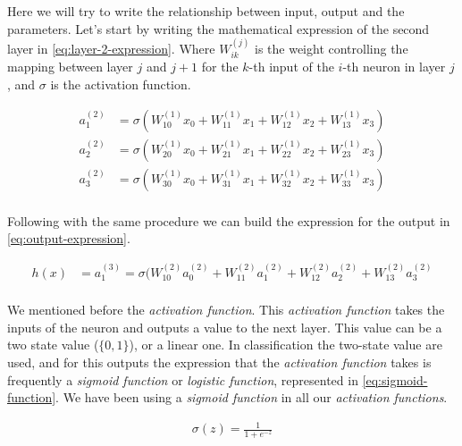 Here we will try to write the relationship between input, output and
the parameters. Let's start by writing the mathematical expression of
the second layer in \autoref{eq:layer-2-expression}. Where
$W_{ik}^{(j)}$ is the weight controlling the mapping between layer $j$
and $j + 1$ for the $k$-th input of the $i$-th neuron in layer $j$,
and $\sigma$ is the activation function.

\begin{equation}
  \begin{aligned}
    \label{eq:layer-2-expression}
    a_1^{(2)} & = \sigma(W_{10}^{(1)} x_0 + W_{11}^{(1)} x_1
    + W_{12}^{(1)} x_2 + W_{13}^{(1)} x_3) \\
    a_2^{(2)} & = \sigma(W_{20}^{(1)} x_0 + W_{21}^{(1)} x_1
    + W_{22}^{(1)} x_2 + W_{23}^{(1)} x_3) \\
    a_3^{(2)} & = \sigma(W_{30}^{(1)} x_0 + W_{31}^{(1)} x_1
    + W_{32}^{(1)} x_2 + W_{33}^{(1)} x_3) \\
  \end{aligned}
\end{equation}

Following with the same procedure we can build the expression for the
output in \autoref{eq:output-expression}.

\begin{equation}
  \begin{aligned}
    \label{eq:output-expression}
    h(x) & = a_1^{(3)} = \sigma(W_{10}^{(2)} a_0^{(2)}
    + W_{11}^{(2)} a_1^{(2)} + W_{12}^{(2)} a_2^{(2)}
    + W_{13}^{(2)} a_3^{(2)} \\
  \end{aligned}
\end{equation}

We mentioned before the \textit{activation function}. This
\textit{activation function} takes the inputs of the neuron and
outputs a value to the next layer. This value can be a two state value
($\{0,1\}$), or a linear one. In classification the two-state value
are used, and for this outputs the expression that the
\textit{activation function} takes is frequently a \textit{sigmoid
function} or \textit{logistic function}, represented in
\autoref{eq:sigmoid-function}. We have been using a \textit{sigmoid
function} in all our \textit{activation functions}.

\begin{equation}
  \begin{aligned}
    \label{eq:sigmoid-function}
    \sigma(z) = \frac{1}{1 + e^{-z}}
  \end{aligned}
\end{equation}

